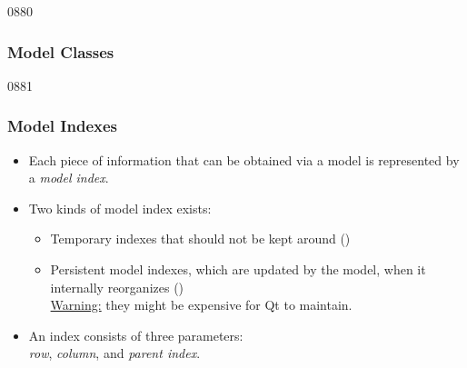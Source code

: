 \begin{slide}[fragile]{0880}\frametitle{Model Classes}
\vfill
{}
\vfill
\end{slide}

\begin{slide}{0881}\frametitle{Model Indexes}\label{modelIndexes}
\begin{itemize}
\item Each piece of information that can be obtained via a model is
  represented by a \emph{model index}.
\item Two kinds of model index exists:
  \begin{itemize}
  \item Temporary indexes that should not be kept around
    ()
  \item Persistent model indexes, which are updated by the model, when it
    internally reorganizes ()\\
    \underline{Warning:} they might be expensive for Qt to maintain.
  \end{itemize}
  \item An index consists of three parameters:\\
    \emph{row}, \emph{column}, and \emph{parent index}.
\end{itemize}
\end{slide}

